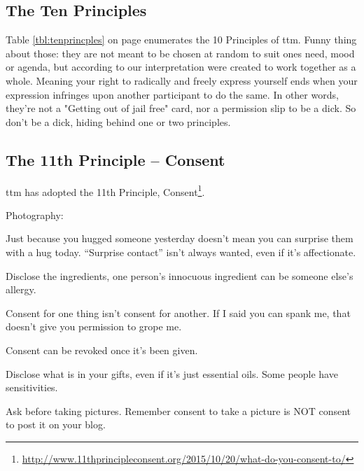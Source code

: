 \subsection*{The Ten Principles}\label{tenprinciples}
Table \ref{tbl:tenprincples} on page \pageref{tbl:tenprincples} enumerates the 10 Principles of \gls{ttm}.
Funny thing about those: they are not meant to be chosen at random to suit ones need, mood or agenda, but according to our interpretation were created to work together as a whole.  
Meaning your right to radically and freely express yourself ends when your expression infringes upon another participant to do the same. 
In other words, they're not a "Getting out of jail free" card, nor a permission slip to be a dick. So don't be a dick, hiding behind one or two principles. 


\ifisflight

\else

\fi


\subsection*{The 11th Principle -- Consent}

\gls{ttm} has adopted the 11th Principle, Consent\footnote{\url{http://www.11thprincipleconsent.org/2015/10/20/what-do-you-consent-to/}}.

\begin{labeling}{Photography:}
	\item[Touch:] Just because you hugged someone yesterday doesn't mean you can surprise them with a hug today. ``Surprise contact'' isn't always wanted, even if it's affectionate.
	\item[Foods:] Disclose the ingredients, one person's innocuous ingredient can be someone else's allergy.
	\item[Kink:] Consent for one thing isn't consent for another. If I said you can spank me, that doesn't give you permission to grope me.
	\item[Sex:] Consent can be revoked once it's been given.
	\item[Gifts:] Disclose what is in your gifts, even if it's just essential oils. Some people have sensitivities.
	\item[Photography:] Ask before taking pictures. Remember consent to take a picture is NOT consent to post it on your blog.
\end{labeling}


